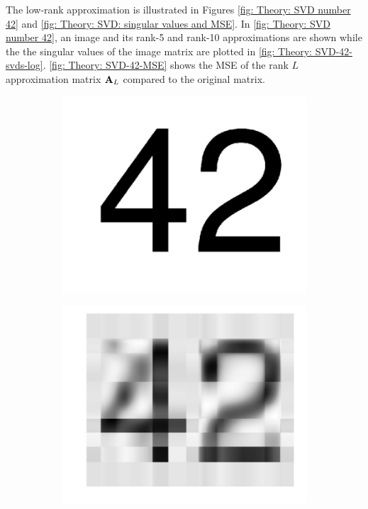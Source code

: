 The low-rank approximation is illustrated in Figures \ref{fig: Theory: SVD number 42} and \ref{fig: Theory: SVD: singular values and MSE}. In \autoref{fig: Theory: SVD number 42}, an image and its rank-5 and rank-10 approximations are shown while the the singular values of the image matrix are plotted in \autoref{fig: Theory: SVD-42-svds-log}. \autoref{fig: Theory: SVD-42-MSE} shows the \gls{MSE} of the rank $L$ approximation matrix ${\mathbf{A}}_L$ compared to the original matrix.
\begin{figure}[tbp!]
    \begin{subfigure}[b]{0.325\textwidth}
        \centering
        \includegraphics[width=\textwidth]{graphics/svd/42-full.pdf}
        \caption{}
        \label{fig: Theory: SVD-42-full}
    \end{subfigure}
    \hfill
    \begin{subfigure}[b]{0.325\textwidth}
        \centering
        \includegraphics[width=\textwidth]{graphics/svd/42-5.pdf}

\end{subfigure}
\end{figure}
